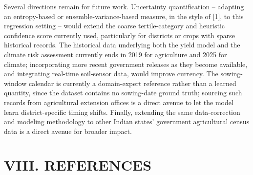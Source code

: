 \documentclass[12pt,a4paper,twocolumn]{article}
\begin{document}
Several directions remain for future work. Uncertainty quantification -- adapting an
entropy-based or ensemble-variance-based measure, in the style of [1], to this
regression setting -- would extend the coarse tertile-category and heuristic
confidence score currently used, particularly for districts or crops with sparse
historical records. The historical data underlying both the yield model and the
climate risk assessment currently ends in 2019 for agriculture and 2025 for climate;
incorporating more recent government releases as they become available, and
integrating real-time soil-sensor data, would improve currency. The sowing-window
calendar is currently a domain-expert reference rather than a learned quantity, since
the dataset contains no sowing-date ground truth; sourcing such records from
agricultural extension offices is a direct avenue to let the model learn
district-specific timing shifts. Finally, extending the same data-correction and
modeling methodology to other Indian states' government agricultural census data is a
direct avenue for broader impact.

\section*{VIII. REFERENCES}
\end{document}

